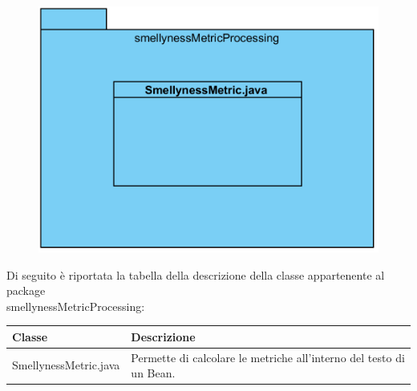 \documentclass[11pt]{article}
\begin{document}
\begin{description}
				\item[ 2.1.1.2.8 Package smellynessMetricProcessing]
				\item \begin{figure}[!h]
					\centering
					\includegraphics{diagrams/SmellynessMetricProcessingPackageDiagram}
				\end{figure}
				Di seguito è riportata la tabella della descrizione della classe appartenente al package \\smellynessMetricProcessing:
				\item \begin{tabular}{|p{}|p{}|}
					\hline
					\textbf{Classe} & \textbf{Descrizione}\\
					\hline
					SmellynessMetric.java & Permette di calcolare le metriche all'interno del testo di un Bean. \\
					\hline
				\end{tabular}
					

\end{description}
\end{document}
